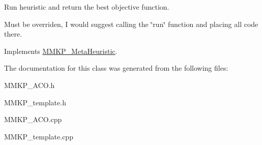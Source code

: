 Run heuristic and return the best objective function. 

Must be overriden, I would suggest calling the \char`\"{}run\char`\"{} function and placing all code there. 

Implements \hyperlink{class_m_m_k_p___meta_heuristic_acc3de42187c16d4a31776e18135035e5}{M\+M\+K\+P\+\_\+\+Meta\+Heuristic}.



The documentation for this class was generated from the following files\+:\begin{DoxyCompactItemize}
\item 
M\+M\+K\+P\+\_\+\+A\+C\+O.\+h\item 
M\+M\+K\+P\+\_\+template.\+h\item 
M\+M\+K\+P\+\_\+\+A\+C\+O.\+cpp\item 
M\+M\+K\+P\+\_\+template.\+cpp\end{DoxyCompactItemize}
